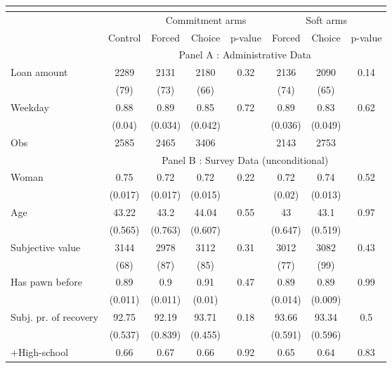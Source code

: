 \begin{tabular}{lccccccc}
\toprule
      & \multicolumn{7}{c}{} \\
\midrule
      &       & \multicolumn{3}{c}{Commitment arms} & \multicolumn{3}{c}{Soft arms} \\
\midrule
\midrule
      & \multicolumn{1}{p{4.545em}}{Control} & \multicolumn{1}{p{4.955em}}{Forced} & \multicolumn{1}{p{3.455em}}{Choice} & \multicolumn{1}{p{3.455em}}{p-value} & \multicolumn{1}{p{4.045em}}{Forced} & \multicolumn{1}{p{4.045em}}{Choice } & \multicolumn{1}{p{4.545em}}{p-value} \\
\midrule
      & \multicolumn{7}{c}{Panel A : Administrative Data} \\
\midrule
\midrule
Loan amount  & 2289  & 2131  & 2180  & 0.32  & 2136  & 2090  & 0.14 \\
      & (79)  & (73)  & (66)  &       & (74)  & (65)  &  \\
Weekday & 0.88  & 0.89  & 0.85  & 0.72  & 0.89  & 0.83  & 0.62 \\
      & (0.04) & (0.034) & (0.042) &       & (0.036) & (0.049) &  \\
\midrule
Obs   & 2585  & 2465  & 3406  &       & 2143  & 2753  &  \\
\midrule
      & \multicolumn{7}{c}{Panel B : Survey Data (unconditional)} \\
Woman & 0.75  & 0.72  & 0.72  & 0.22  & 0.72  & 0.74  & 0.52 \\
      & (0.017) & (0.017) & (0.015) &       & (0.02) & (0.013) &  \\
Age   & 43.22 & 43.2  & 44.04 & 0.55  & 43    & 43.1  & 0.97 \\
      & (0.565) & (0.763) & (0.607) &       & (0.647) & (0.519) &  \\
Subjective value & 3144  & 2978  & 3112  & 0.31  & 3012  & 3082  & 0.43 \\
      & (68)  & (87)  & (85)  &       & (77)  & (99)  &  \\
Has pawn before & 0.89  & 0.9   & 0.91  & 0.47  & 0.89  & 0.89  & 0.99 \\
      & (0.011) & (0.011) & (0.01) &       & (0.014) & (0.009) &  \\
Subj. pr. of recovery & 92.75 & 92.19 & 93.71 & 0.18  & 93.66 & 93.34 & 0.5 \\
      & (0.537) & (0.839) & (0.455) &       & (0.591) & (0.596) &  \\
+High-school & 0.66  & 0.67  & 0.66  & 0.92  & 0.65  & 0.64  & 0.83 \\

\end{tabular}
